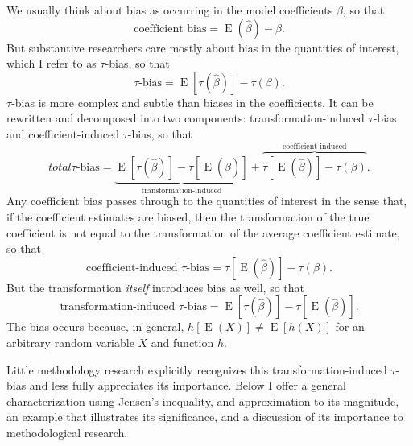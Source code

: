\documentclass[12pt]{article}
\DeclareMathOperator*{\E}{\text{E}}
\begin{document}
We usually think about bias as occurring in the model coefficients $\beta$, so that 
\begin{equation}
\text{coefficient bias} = \E(\hat{\beta}) - \beta \text{.}  \nonumber
\end{equation}
But substantive researchers care mostly about bias in the quantities of interest, which I refer to as $\tau$-bias, so that
\begin{equation}
\tau\text{-bias} = \E[\tau(\hat{\beta})] - \tau(\beta)\text{.} \nonumber
\end{equation}
$\tau$-bias is more complex and subtle than biases in the coefficients. 
It can be rewritten and decomposed into two components: transformation-induced $\tau$-bias and coefficient-induced $\tau$-bias, so that
\begin{equation}
total \tau\text{-bias}= \underbrace{ \E[\tau(\hat{\beta})]-  \tau[\E(\hat{\beta})]  }_{\text{transformation-induced}} + \overbrace{  \tau[\E(\hat{\beta})] - \tau(\beta)  }^{\text{coefficient-induced}}\text{.} \nonumber
\end{equation}
Any coefficient bias passes through to the quantities of interest in the sense that, if the coefficient estimates are biased, then the transformation of the true coefficient is not equal to the transformation of the average coefficient estimate, so that
\begin{equation}
\text{coefficient-induced } \tau\text{-bias} = \tau[\E(\hat{\beta})] - \tau(\beta) \text{.}\nonumber
\end{equation}
But the transformation \textit{itself} introduces bias as well, so that
\begin{equation}
\text{transformation-induced } \tau\text{-bias} = \E[\tau(\hat{\beta})]-  \tau[\E(\hat{\beta})] \text{.}\nonumber
\end{equation}
The bias occurs because, in general, $h[\E(X)] \neq \E[h(X)]$ for an arbitrary random variable $X$ and function $h$.

Little methodology research explicitly recognizes this transformation-induced $\tau$-bias and less fully appreciates its importance. 
Below I offer a general characterization using Jensen's inequality, and approximation to its magnitude, an example that illustrates its significance, and a discussion of its importance to methodological research.

\end{document}
